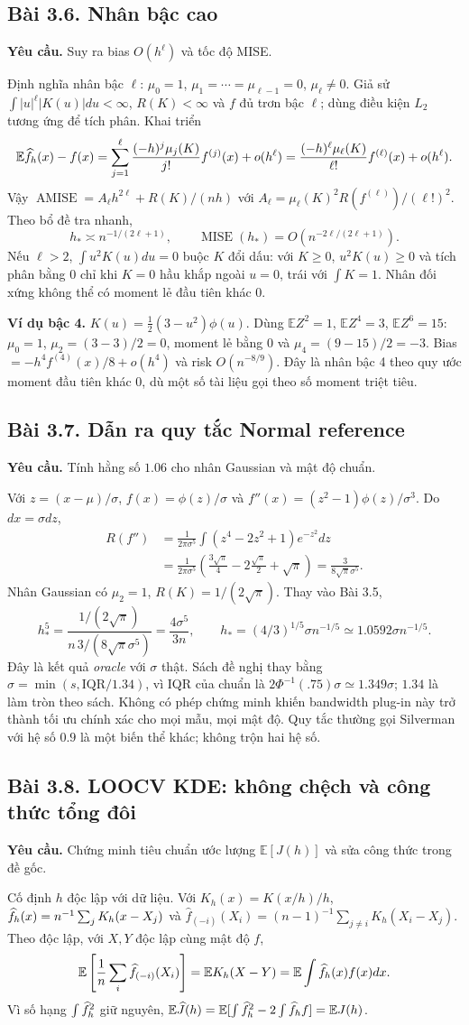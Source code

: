\documentclass[11pt,a4paper]{article}
\newcommand{\E}{\mathbb E}\newcommand{\Pp}{\mathbb P}
\DeclareMathOperator{\MISE}{MISE}\DeclareMathOperator{\AMISE}{AMISE}
\newcommand{\prob}[3]{\subsection{Bài #1. #2}\label{b:#1}\textbf{Yêu cầu.} #3\par}
\begin{document}
\prob{3.6}{Nhân bậc cao}{Suy ra bias $O(h^\ell)$ và tốc độ MISE.}
Định nghĩa nhân bậc $\ell$: $\mu_0=1$, $\mu_1=\cdots=\mu_{\ell-1}=0$, $\mu_\ell\ne0$. Giả sử $\int|u|^\ell|K(u)|du<\infty$, $R(K)<\infty$ và $f$ đủ trơn bậc $\ell$; dùng điều kiện $L_2$ tương ứng để tích phân. Khai triển
\[
\E\fh(x)-f(x)=\sum_{j=1}^{\ell}\frac{(-h)^j\mu_j(K)}{j!}f^{(j)}(x)+o(h^\ell)
=\frac{(-h)^\ell\mu_\ell(K)}{\ell!}f^{(\ell)}(x)+o(h^\ell).
\]
Vậy $\AMISE=A_\ell h^{2\ell}+R(K)/(nh)$ với
$A_\ell=\mu_\ell(K)^2R(f^{(\ell)})/(\ell!)^2$. Theo bổ đề tra nhanh,
\[
h_*\asymp n^{-1/(2\ell+1)},\qquad \MISE(h_*)=O(n^{-2\ell/(2\ell+1)}).
\]
Nếu $\ell>2$, $\int u^2K(u)du=0$ buộc $K$ đổi dấu: với $K\ge0$, $u^2K(u)\ge0$ và tích phân bằng 0 chỉ khi $K=0$ hầu khắp ngoài $u=0$, trái với $\int K=1$. Nhân đối xứng không thể có moment lẻ đầu tiên khác 0.

\textbf{Ví dụ bậc 4.} $K(u)=\tfrac12(3-u^2)\phi(u)$. Dùng $\E Z^2=1$, $\E Z^4=3$, $\E Z^6=15$:
$\mu_0=1$, $\mu_2=(3-3)/2=0$, moment lẻ bằng 0 và $\mu_4=(9-15)/2=-3$.
Bias $=-h^4f^{(4)}(x)/8+o(h^4)$ và risk $O(n^{-8/9})$. Đây là nhân bậc 4 theo quy ước moment đầu tiên khác 0, dù một số tài liệu gọi theo số moment triệt tiêu.

\prob{3.7}{Dẫn ra quy tắc Normal reference}{Tính hằng số $1.06$ cho nhân Gaussian và mật độ chuẩn.}
Với $z=(x-\mu)/\sigma$, $f(x)=\phi(z)/\sigma$ và
$f''(x)=(z^2-1)\phi(z)/\sigma^3$. Do $dx=\sigma dz$,
\begin{align*}
R(f'')&=\frac1{2\pi\sigma^5}\int(z^4-2z^2+1)e^{-z^2}dz\\
&=\frac1{2\pi\sigma^5}\left(\frac{3\sqrt\pi}{4}-2\frac{\sqrt\pi}{2}+\sqrt\pi\right)
=\frac3{8\sqrt\pi\sigma^5}.
\end{align*}
Nhân Gaussian có $\mu_2=1$, $R(K)=1/(2\sqrt\pi)$. Thay vào Bài 3.5,
\[
h_*^5=\frac{1/(2\sqrt\pi)}{n\,3/(8\sqrt\pi\sigma^5)}=\frac{4\sigma^5}{3n},\qquad
h_*=(4/3)^{1/5}\sigma n^{-1/5}\simeq1.0592\sigma n^{-1/5}.
\]
Đây là kết quả \emph{oracle} với $\sigma$ thật. Sách đề nghị thay bằng $\widehat\sigma=\min(s,\mathrm{IQR}/1.34)$, vì IQR của chuẩn là $2\Phi^{-1}(.75)\sigma\simeq1.349\sigma$; $1.34$ là làm tròn theo sách. Không có phép chứng minh khiến bandwidth plug-in này trở thành tối ưu chính xác cho mọi mẫu, mọi mật độ. Quy tắc thường gọi Silverman với hệ số $0.9$ là một biến thể khác; không trộn hai hệ số.

\prob{3.8}{LOOCV KDE: không chệch và công thức tổng đôi}{Chứng minh tiêu chuẩn ước lượng $\E[J(h)]$ và sửa công thức trong đề gốc.}
Cố định $h$ độc lập với dữ liệu. Với $K_h(x)=K(x/h)/h$,
$\widehat f_h(x)=n^{-1}\sum_jK_h(x-X_j)$ và
$\widehat f_{(-i)}(X_i)=(n-1)^{-1}\sum_{j\ne i}K_h(X_i-X_j)$.
Theo độc lập, với $X,Y$ độc lập cùng mật độ $f$,
\[
\E\left[\frac1n\sum_i\widehat f_{(-i)}(X_i)\right]
=\E K_h(X-Y)=\E\int\fh(x)f(x)dx.
\]
Vì số hạng $\int\widehat f_h^2$ giữ nguyên,
$\E\widehat J(h)=\E[\int\fh^2-2\int\fh f]=\E J(h)$.
\end{document}
